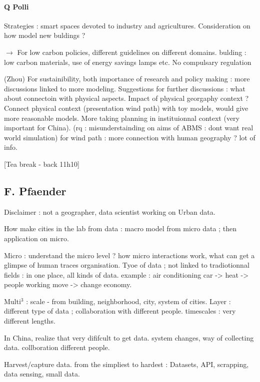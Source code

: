 \paragraph{Q Polli}

Strategies : smart spaces devoted to industry and agricultures. Consideration on how model new buldings ?

$\rightarrow$ For low carbon policies, different guidelines on different domains. bulding : low carbon materials, use of energy savings lamps etc. No compulsary regulation


(Zhou) For sustainibility, both importance of research and policy making : more discussions linked to more modeling. Suggestions for further discussions : what about connectoin with physical aspects. Impact of physical georgaphy context ? Connect physical context (presentation wind path) with toy models, would give more reasonable models. More taking planning in instituionnal context (very important for China).
(rq : misunderstainding on aims of ABMS : dont want real world simulation)
for wind path : more connection with human geography ?
lot of info.


[Tea break - back 11h10]




\subsection*{F. Pfaender}

Disclaimer : not a geographer, data scientist working on Urban data.

How make cities in the lab from data : macro model from micro data ; then application on micro.

Micro : understand the micro level ? how micro interactions work, what can get a glimpse of human traces organisation.
Tyoe of data ; not linked to tradiotionnal fields : in one place, all kinds of data. example : air conditioning car -> heat -> people working move -> change economy.

Multi$^3$ : scale - from building, neighborhood, city, system of cities.
Layer : different type of data ; collaboration with different people.
timescales : very different lengths.

In China, realize that very dififcult to get data. system changes, way of collecting data. collboration different people. 

Harvest/capture data.
from the simpliest to hardest : Datasets, API, scrapping, data sensing, small data.

